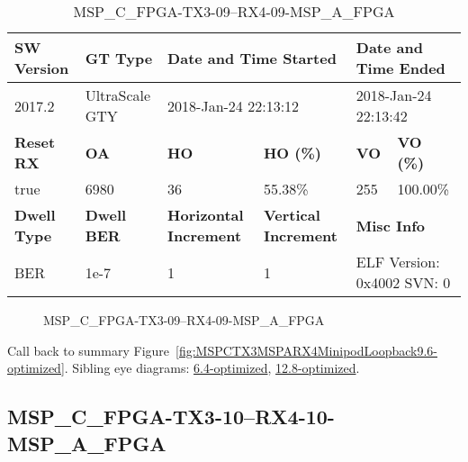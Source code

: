 \begin{table}[h]
\centering
\caption{MSP\_C\_FPGA-TX3-09--RX4-09-MSP\_A\_FPGA}
\label{tab:MSPCFPGATX309RX409MSPAFPGA9.6-optimized}
\begin{tabular}{@{}|l|l|l|l|l|l|@{}}
\toprule
\textbf{SW Version}                & \textbf{GT Type}   & \multicolumn{2}{l|}{\textbf{Date and Time Started}}            & \multicolumn{2}{l|}{\textbf{Date and Time Ended}}        \\ \midrule
2017.2                       & UltraScale GTY          & \multicolumn{2}{l|}{2018-Jan-24 22:13:12}                   & \multicolumn{2}{l|}{2018-Jan-24 22:13:42}               \\ \midrule
\textbf{Reset RX}                  & \textbf{OA} & \textbf{HO}   & \textbf{HO (\%)} & \textbf{VO} & \textbf{VO (\%)} \\ \midrule
true & 6980        & 36          & 55.38\%        & 255        & 100.00\%       \\ \midrule
\textbf{Dwell Type}                & \textbf{Dwell BER} & \textbf{Horizontal Increment} & \textbf{Vertical Increment}    & \multicolumn{2}{l|}{\textbf{Misc Info}}                  \\ \midrule
BER                            & 1e-7        & 1        & 1           & \multicolumn{2}{l|}{ELF Version: 0x4002 SVN: 0}                         \\ \bottomrule
\end{tabular}
\end{table}

\begin{figure}[h]
\caption{MSP\_C\_FPGA-TX3-09--RX4-09-MSP\_A\_FPGA} \label{fig:MSPCFPGATX309RX409MSPAFPGA9.6-optimized}
\end{figure}

Call back to summary Figure~\ref{fig:MSPCTX3MSPARX4MinipodLoopback9.6-optimized}.
Sibling eye diagrams: \hyperref[sec:MSPCFPGATX309RX409MSPAFPGA6.4-optimized]{6.4-optimized}, \hyperref[sec:MSPCFPGATX309RX409MSPAFPGA12.8-optimized]{12.8-optimized}.

\clearpage
\newpage


\subsection{MSP\_C\_FPGA-TX3-10--RX4-10-MSP\_A\_FPGA}\label{sec:MSPCFPGATX310RX410MSPAFPGA9.6-optimized}

